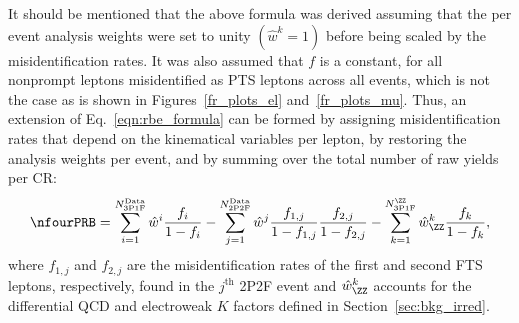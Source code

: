 It should be mentioned that the above formula was derived assuming that the per event analysis weights were set to unity $\left( \hat{w}^k = 1 \right)$ before being scaled by the misidentification rates.
It was also assumed that $f$ is a constant, for all nonprompt leptons misidentified as PTS leptons across all events, which is not the case as is shown in Figures~\ref{fr_plots_el} and~\ref{fr_plots_mu}.
Thus, an extension of Eq.~\ref{eqn:rbe_formula} can be formed by assigning misidentification rates that depend on the kinematical variables per lepton,
by restoring the analysis weights per event,
and by summing over the total number of raw yields per CR:
\begin{equation}
	\label{eqn:rbe_formula_final}
	\nfourPRB =
	  \sum_{i=1}^{N_{\text{3P1F}}^\text{Data}} \hat{w}^i \frac{f_i}{1 - f_i}
	- \sum_{j=1}^{N_{\text{2P2F}}^\text{Data}} \hat{w}^j \frac{f_{1,j}}{1 - f_{1,j}}\frac{f_{2,j}}{1 - f_{2,j}}
	- \sum_{k=1}^{N_{\text{3P1F}}^{\ZZ}} \hat{w}^{k}_{\ZZ} \frac{f_k}{1 - f_k},
\end{equation}
where $f_{1,j}$ and $f_{2,j}$ are the misidentification rates of the first and second FTS leptons, respectively, found in the $j^{\text{th}}$ 2P2F event
and $\hat{w}^k_{\ZZ}$ accounts for the differential QCD and electroweak $K$ factors defined in Section~\ref{sec:bkg_irred}.
